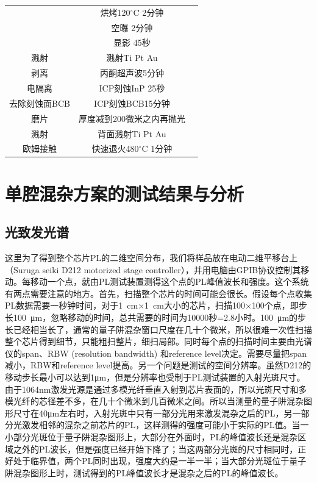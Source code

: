 \documentclass{ZJUthesis}
\begin{document}
\begin{table}[htbp]
\begin{tabular}{ccc}
            &烘烤120$^{\circ}$C 2分钟 &\\
            &空曝 2分钟 &\\
            &显影 45秒 &\\
        \hline
        溅射 &溅射Ti Pt Au &\\
        \hline
        剥离 &丙酮超声波5分钟 &\\
        \hline
        电隔离 &ICP刻蚀InP 25秒 &\\
        \hline
        去除刻蚀面BCB &ICP刻蚀BCB15分钟 &\\
        \hline
        磨片 &厚度减到200微米之内再抛光 &\\
        \hline
        溅射 &背面溅射Ti Pt Au &\\
        \hline
        欧姆接触 &快速退火480$^{\circ}$C 1分钟 &\\
        \hline
        \hline
    \end{tabular}
\end{table}

\section{单腔混杂方案的测试结果与分析}

\subsection{光致发光谱}

这里为了得到整个芯片PL的二维空间分布，我们将样品放在电动二维平移台上（Suruga seiki D212 motorized stage controller），并用电脑由GPIB协议控制其移动。每移动一个点，就由PL测试装置测得这个点的PL峰值波长和强度。这个系统有两点需要注意的地方。首先，扫描整个芯片的时间可能会很长。假设每个点收集PL数据需要一秒钟时间，对于1~cm$\times$1~cm大小的芯片，扫描100$\times$100个点，即步长100~μm，忽略移动的时间，总共需要的时间为10000秒=2.8小时。100~μm的步长已经相当长了，通常的量子阱混杂窗口尺度在几十个微米，所以很难一次性扫描整个芯片得到细节，只能粗扫整片，细扫局部。同时每个点的扫描时间主要由光谱仪的span、RBW (resolution bandwidth) 和reference level决定。需要尽量把span减小，RBW和reference level提高。另一个问题是测试的空间分辨率。虽然D212的移动步长最小可以达到1μm，但是分辨率也受制于PL测试装置的入射光斑尺寸。由于1064nm激发光源是通过多模光纤垂直入射到芯片表面的，所以光斑尺寸和多模光纤的芯径差不多，在几十个微米到几百微米之间。所以当测量的量子阱混杂图形尺寸在40μm左右时，入射光斑中只有一部分光用来激发混杂之后的PL，另一部分光激发相邻的混杂之前芯片的PL，这样测得的强度可能小于实际的PL值。当一小部分光斑位于量子阱混杂图形上，大部分在外面时，PL的峰值波长还是混杂区域之外的PL波长，但是强度已经开始下降了；当这两部分光斑的尺寸相同时，正好处于临界值，两个PL同时出现，强度大约是一半一半；当大部分光斑位于量子阱混杂图形上时，测试得到的PL峰值波长才是混杂之后的PL的峰值波长。
\end{document}
